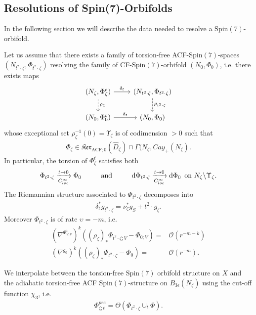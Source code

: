 \documentclass[psamsfonts]{amsart}
\theoremstyle{plain}
\theoremstyle{definition}{
\newtheorem{defi}{Definition}[section]
\newtheorem{ass}{Assumption}
\newtheorem*{nota}{Notation}}
\theoremstyle{remark}{
\newtheorem{rem}{Remark}
\newtheorem{ex}{Example}}
\theoremstyle{plain}{
\newtheorem{thm}{Theorem}[section]
\newtheorem{lem}{Lemma}[section]
\newtheorem{cor}{Corollary}[section]
\newtheorem{prop}{Proposition}[section]
\newtheorem{con}{Conjecture}[section]}
\newenvironment{manualassumption}[1]{%
  \renewcommand\themanualassumptioninner{#1}%
  \manualassumptioninner
}{\endmanualassumptioninner}
\newcommand{\m}[1]{{\mathrm{#1}}}
\newcommand{\und}[1]{\hspace{#1}\text{and}\hspace{#1}}
\begin{document}
\subsection{Resolutions of Spin(7)-Orbifolds}
\label{Resolutions of Spin(7)-Orbifolds}
In the following section we will describe the data needed to resolve a $\m{Spin}(7)$-orbifold.
\begin{manualassumption}{1}
\label{assTypeiSpin7}    
Let us assume that there exists a family of torsion-free ACF-$\m{Spin}(7)$-spaces $(N_{t^2\cdot\zeta},\Phi_{t^2\cdot \zeta})$ resolving the family of CF-$\m{Spin}(7)$-orbifold $(N_0,\Phi_0)$, i.e. there exists maps 
\begin{equation*}
\begin{tikzcd}
        (N_\zeta,\Phi^t_\zeta)\arrow[d,dashed,"\rho_\zeta"]\arrow[r,"\delta_t"]&(N_{t^2\cdot\zeta},\Phi_{t^2\cdot\zeta})\arrow[d,dashed,"\rho_{t^2\cdot\zeta}"]\\
        (N_0,\Phi^t_0)\arrow[r,"\delta_t"]&(N_0,\Phi_0)
\end{tikzcd}
\end{equation*}
whose exceptional set $\rho_\zeta^{-1}(0)=\Upsilon_\zeta$ is of codimension $>0$ such that
\begin{align*}
    \Phi_\zeta\in \mathfrak{Ker}_{\m{ACF};0}(\widehat{D}_{\zeta})\cap\Gamma(N_\zeta,Cay_+(N_\zeta).
\end{align*}
In particular, the torsion of $\Phi^t_\zeta$ satisfies both
\begin{align*}
    \Phi_{t^2\cdot\zeta}\xrightarrow[C^\infty_{loc}]{t\to0}\Phi_0\und{1.0cm}\m{d}\Phi_{t^2\cdot\zeta}\xrightarrow[C^\infty_{loc}]{t\to0}\m{d}\Phi_0\,\text{ on }N_\zeta\backslash\Upsilon_\zeta.
\end{align*}
The Riemannian structure associated to $\Phi_{t^2\cdot\zeta}$ decomposes into 
\begin{align*}
    \delta^*_tg_{t^2\cdot \zeta}=\nu_\zeta^*g_S+t^2\cdot g_\zeta.
\end{align*}
Moreover $\Phi_{t^2\cdot \zeta}$ is of rate $\upsilon=-m$, i.e.
\begin{align*}
    (\nabla^{\Phi^t_{V,\nu}})^k((\rho_\zeta)_*\Phi_{t^2\cdot\zeta;V}-\Phi_{0;V})=&\mathcal{O}(r^{-m-k})\\
    (\nabla^{g_0})^k((\rho_\zeta)_*\Phi_{t^2\cdot\zeta}-\Phi_{0})=&\mathcal{O}(r^{-m}).
\end{align*}
\end{manualassumption}


\begin{defi}
    We interpolate between the torsion-free $\m{Spin}(7)$ orbifold structure on $X$ and the adiabatic torsion-free ACF $\m{Spin}(7)$-structure on $B_{3\epsilon}(N_\zeta)$ using the cut-off function ${\chi_3}$, i.e.
\begin{align}
    \label{pregluedspin7}\Phi^{pre}_{\zeta;t}=\Theta(\Phi_{t^2\cdot\zeta}\cup_t\Phi).
\end{align}
\end{defi}
\end{document}
